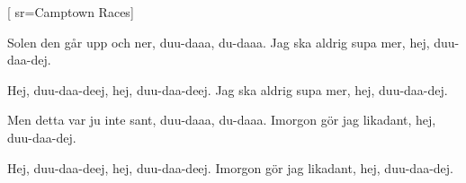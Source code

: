 


[ 	%
	sr={Camptown Races}]	%
	
\beginverse*		%
Solen den går upp och ner,
duu-daaa, du-daaa.
Jag ska aldrig supa mer,
hej, duu-daa-dej.

Hej, duu-daa-deej,
hej, duu-daa-deej.
Jag ska aldrig supa mer,
hej, duu-daa-dej.
\endverse	

\beginverse*		%
Men detta var ju inte sant,
duu-daaa, du-daaa.
Imorgon gör jag likadant,
hej, duu-daa-dej.

Hej, duu-daa-deej,
hej, duu-daa-deej.
Imorgon gör jag likadant,
hej, duu-daa-dej.
\endverse
\endsong			%
